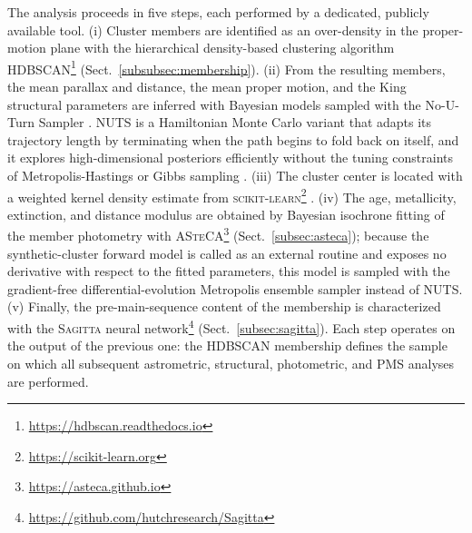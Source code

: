 \documentclass{aa}
\begin{document}
The analysis proceeds in five steps, each performed by a dedicated, publicly available tool\@. (i) Cluster members are identified as an over-density in the proper-motion plane with the hierarchical density-based clustering algorithm \textsc{HDBSCAN}\footnote{\url{https://hdbscan.readthedocs.io}} \citep{10.1007/978-3-642-37456-2_14,McInnes2017} (Sect.~\ref{subsubsec:membership})\@. (ii) From the resulting members, the mean parallax and distance, the mean proper motion, and the King structural parameters are inferred with Bayesian models sampled with the No-U-Turn Sampler \citep[NUTS;][]{2014JMLR...15.1593H}. NUTS is a Hamiltonian Monte Carlo variant that adapts its trajectory length by terminating when the path begins to fold back on itself, and it explores high-dimensional posteriors efficiently without the tuning constraints of Metropolis-Hastings or Gibbs sampling \citep{pymc2023}\@. (iii) The cluster center is located with a weighted kernel density estimate from \textsc{scikit-learn}\footnote{\url{https://scikit-learn.org}} \citep{scikit-learn}\@. (iv) The age, metallicity, extinction, and distance modulus are obtained by Bayesian isochrone fitting of the member photometry with \textsc{ASteCA}\footnote{\url{https://asteca.github.io}} \citep{2015A&A...576A...6P} (Sect.~\ref{subsec:asteca}); because the synthetic-cluster forward model is called as an external routine and exposes no derivative with respect to the fitted parameters, this model is sampled with the gradient-free differential-evolution Metropolis ensemble sampler \citep[DEMetropolis;][]{2006S&C....16..239T} instead of NUTS\@. (v) Finally, the pre-main-sequence content of the membership is characterized with the \textsc{Sagitta} neural network\footnote{\url{https://github.com/hutchresearch/Sagitta}} \citep{2021AJ....162..282M} (Sect.~\ref{subsec:sagitta}). Each step operates on the output of the previous one: the \textsc{HDBSCAN} membership defines the sample on which all subsequent astrometric, structural, photometric, and PMS analyses are performed.
\end{document}
